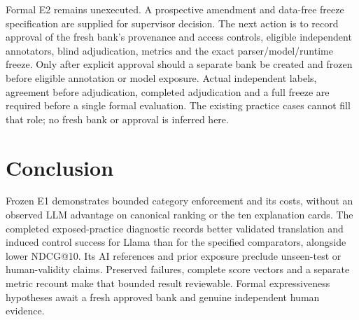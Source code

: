 \documentclass[conference]{IEEEtran}
\begin{document}
Formal E2 remains unexecuted. A prospective amendment and data-free freeze specification are supplied for supervisor decision. The next action is to record approval of the fresh bank's provenance and access controls, eligible independent annotators, blind adjudication, metrics and the exact parser/model/runtime freeze. Only after explicit approval should a separate bank be created and frozen before eligible annotation or model exposure. Actual independent labels, agreement before adjudication, completed adjudication and a full freeze are required before a single formal evaluation. The existing practice cases cannot fill that role; no fresh bank or approval is inferred here.

\section{Conclusion}
Frozen E1 demonstrates bounded category enforcement and its costs, without an observed LLM advantage on canonical ranking or the ten explanation cards. The completed exposed-practice diagnostic records better validated translation and induced control success for Llama than for the specified comparators, alongside lower NDCG@10. Its AI references and prior exposure preclude unseen-test or human-validity claims. Preserved failures, complete score vectors and a separate metric recount make that bounded result reviewable. Formal expressiveness hypotheses await a fresh approved bank and genuine independent human evidence.

\clearpage


\end{document}
